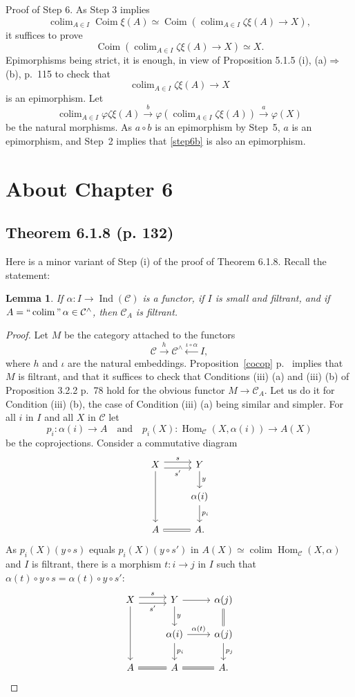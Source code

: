 \documentclass[12pt]{article}
\newtheorem{lem}[thm]{Lemma}
\theoremstyle{remark}
\theoremstyle{definition}
\newcommand{\C}{\mathcal C}
\newcommand{\then}{\Rightarrow}
\DeclareMathOperator*{\coli}{colim}
\DeclareMathOperator*{\co}{colim}
\DeclareMathOperator*{\ic}{``\coli"}
\DeclareMathOperator{\Coim}{Coim}
\DeclareMathOperator{\Hom}{Hom}%
\DeclareMathOperator{\Ind}{Ind}
\begin{document}
\noindent Proof of Step 6. As Step 3 implies 
$$
\coli_{A\in I}\Coim\xi(A)\simeq\Coim\left(\coli_{A\in I}\zeta\xi(A)\to X\right),
$$ 
it suffices to prove 
%
\begin{equation}\label{step6a}
\Coim\left(\coli_{A\in I}\zeta\xi(A)\to X\right)\simeq X.
\end{equation}
% 
Epimorphisms being strict, it is enough, in view of Proposition 5.1.5 (i), (a)$\then$(b), p.~115 to check that 
%
\begin{equation}\label{step6b}
\coli_{A\in I}\zeta\xi(A)\to X
\end{equation}
% 
is an epimorphism. Let 
$$
\coli_{A\in I}\varphi\zeta\xi(A)\xrightarrow{b}\varphi\left(\coli_{A\in I}\zeta\xi(A)\right)\xrightarrow{a}\varphi(X)
$$
be the natural morphisms. As $a\circ b$ is an epimorphism by Step~5, $a$ is an epimorphism, and Step~2 implies that \eqref{step6b} is also an epimorphism.
%
%
\section{About Chapter 6}
%
\subsection{Theorem 6.1.8 (p. 132)}
%
Here is a minor variant of Step (i) of the proof of Theorem 6.1.8. Recall the statement: 
%
\begin{lem} 
If $\alpha:I\to\Ind(\C)$ is a functor, if $I$ is small and filtrant, and if $A=\ic\alpha\in\C^\wedge$, then $\C_A$ is filtrant. 
\end{lem} 
%
\begin{proof}
Let $M$ be the category attached to the functors 
$$
\C\xrightarrow h\C^\wedge\xleftarrow{\iota\circ\alpha}I,
$$ 
where $h$ and $\iota$ are the natural embeddings. Proposition~\ref{cocop} p.~\pageref{cocop} implies that $M$ is filtrant, and that it suffices to check that Conditions (iii) (a) and (iii) (b) of Proposition 3.2.2 p.~78 hold for the obvious functor $M\to\C_A$. Let us do it for Condition (iii) (b), the case of Condition (iii) (a) being similar and simpler. For all $i$ in $I$ and all $X$ in $\C$ let 
$$
p_i:\alpha(i)\to A\quad\text{and}\quad p_i(X):\Hom_\C(X,\alpha(i))\to A(X)
$$
be the coprojections. Consider a commutative diagram 
$$
\begin{tikzcd}
X\ar{dd}\ar[yshift=0.7ex]{r}{s}\ar[yshift=-0.7ex]{r}[swap]{s'}&Y\ar{d}{y}\\ 
{}&\alpha(i)\ar{d}{p_i}\\ 
A\ar[equal]{r}&A.
\end{tikzcd}
$$ 
As $p_i(X)(y\circ s)$ equals $p_i(X)(y\circ s')$ in $A(X)\simeq\co\Hom_\C(X,\alpha)$ and $I$ is filtrant, there is a morphism $t:i\to j$ in $I$ such that $\alpha(t)\circ y\circ s=\alpha(t)\circ y\circ s'$:
$$
\begin{tikzcd}
X\ar{dd}\ar[yshift=0.7ex]{r}{s}\ar[yshift=-0.7ex]{r}[swap]{s'}&Y\ar{d}{y}\ar{r}&\alpha(j)\ar[equal]{d}\\ 
{}&\alpha(i)\ar{d}{p_i}\ar{r}{\alpha(t)}&\alpha(j)\ar{d}{p_j}\\ 
A\ar[equal]{r}&A\ar[equal]{r}&A.
\end{tikzcd}
$$
\end{proof}
%
%
\end{document}
